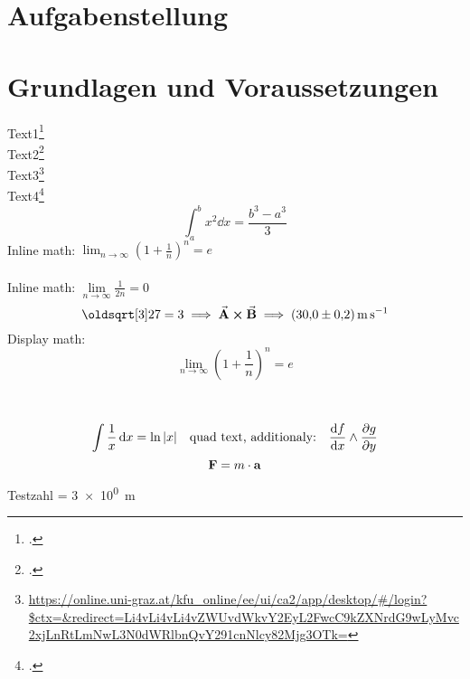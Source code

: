 \documentclass[ngerman]{scrartcl}
\begin{document}


\clearpage
\tableofcontents
\newpage

\section{Aufgabenstellung}
\label{sec:aufgabenstellung}



\section{Grundlagen und Voraussetzungen}
\label{sec:grundlagen_voraussetzungen}

Text1\footcite[1000]{ref:dem1} \\
Text2\footcite[Kapitel 74]{ref:knoll} \\
Text3\footnote{\url{https://online.uni-graz.at/kfu_online/ee/ui/ca2/app/desktop/\#/login?$ctx=&redirect=Li4vLi4vLi4vZWUvdWkvY2EyL2FwcC9kZXNrdG9wLyMvc2xjLnRtLmNwL3N0dWRlbnQvY291cnNlcy82Mjg3OTk=}} \\  %
Text4\footcite{ref:genol2013}
%
\begin{equation}
    \label{eq:grenzen-oben-unten}
    \int_a^b x^2 \dd{x} =\frac{b^3-a^3}{3}  %
\end{equation}
%
Inline math: \(\lim_{n \to \infty} \left( 1 + \frac{1}{n} \right) ^{n} = e\)  \\ \\ %
Inline math: $\lim \limits_{n \to \infty} \frac{1}{2n} = 0$  %
%
\begin{displaymath}
    \sqrt[3]{27} = 3 \implies \va{A} \cross \va{B} \implies \SI{30.0(2)}{\meter\per\second}
\end{displaymath}
%
Display math: \[\lim_{n \to \infty} \left( 1 + \frac{1}{n} \right) ^{n} = e\]  \\ \\ %
\[ \int \frac{1}{x} \dd{x} = \ln|x| \qq{quad text, additionaly:} \dv{f}{x} \land \pdv{g}{y}\]  %
$$ \vb{F} = m \cdot \vb{a} $$  %

Testzahl = \SI{3e0}{\meter}
\end{document}
